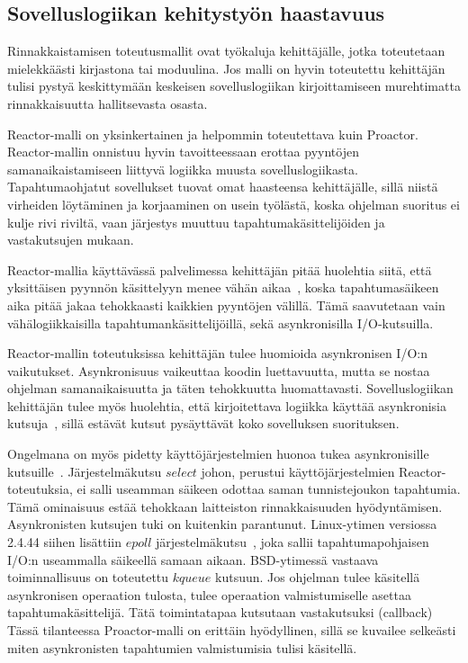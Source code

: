 \documentclass[finnish]{tktltiki2}
\theoremstyle{definition}
\theoremstyle{remark}
\begin{document}
\subsection{Sovelluslogiikan kehitystyön haastavuus}
Rinnakkaistamisen toteutusmallit ovat työkaluja kehittäjälle,
jotka toteutetaan mielekkäästi kirjastona tai moduulina.
Jos malli on hyvin toteutettu kehittäjän tulisi pystyä
keskittymään keskeisen sovelluslogiikan kirjoittamiseen
murehtimatta rinnakkaisuutta hallitsevasta osasta.

Reactor-malli on yksinkertainen ja helpommin toteutettava
kuin Proactor. Reactor-mallin onnistuu hyvin tavoitteessaan
erottaa pyyntöjen samanaikaistamiseen liittyvä logiikka
muusta sovelluslogiikasta.
Tapahtumaohjatut sovellukset tuovat omat haasteensa
kehittäjälle, sillä niistä virheiden löytäminen ja
korjaaminen on usein työlästä, koska ohjelman
suoritus ei kulje rivi riviltä, vaan järjestys
muuttuu tapahtumakäsittelijöiden ja vastakutsujen mukaan.

Reactor-mallia käyttävässä palvelimessa kehittäjän
pitää huolehtia siitä, että yksittäisen pyynnön
käsittelyyn menee vähän aikaa~\cite{pyarali_proactor_1997}, koska
tapahtumasäikeen aika pitää jakaa tehokkaasti
kaikkien pyyntöjen välillä. Tämä saavutetaan
vain vähälogiikkaisilla tapahtumankäsittelijöillä, sekä
asynkronisilla I/O-kutsuilla.

Reactor-mallin toteutuksissa kehittäjän tulee huomioida
asynkronisen I/O:n vaikutukset. Asynkronisuus vaikeuttaa koodin
luettavuutta, mutta se nostaa ohjelman samanaikaisuutta ja täten
tehokkuutta huomattavasti. Sovelluslogiikan kehittäjän
tulee myös huolehtia, että kirjoitettava logiikka
käyttää asynkronisia kutsuja~\cite{pyarali_proactor_1997}, sillä estävät
kutsut pysäyttävät koko sovelluksen suorituksen.

Ongelmana on myös pidetty käyttöjärjestelmien huonoa
tukea asynkronisille kutsuille~\cite{pyarali_proactor_1997}. Järjestelmäkutsu
$select$ johon, perustui käyttöjärjestelmien Reactor-toteutuksia,
ei salli useamman säikeen odottaa saman tunnistejoukon tapahtumia.
Tämä ominaisuus estää tehokkaan laitteiston rinnakkaisuuden hyödyntämisen.
Asynkronisten kutsujen tuki on kuitenkin parantunut.
Linux-ytimen versiossa
2.4.44 siihen lisättiin $epoll$ järjestelmäkutsu~\cite{man_epoll}, joka
sallii tapahtumapohjaisen I/O:n useammalla säikeellä
samaan aikaan. BSD-ytimessä vastaava toiminnallisuus on toteutettu $kqueue$
kutsuun.
Jos ohjelman tulee käsitellä
asynkronisen operaation tulosta, tulee operaation valmistumiselle
asettaa tapahtumakäsittelijä. Tätä toimintatapaa kutsutaan vastakutsuksi (callback)
Tässä tilanteessa Proactor-malli on erittäin hyödyllinen, sillä se
kuvailee selkeästi miten asynkronisten tapahtumien valmistumisia tulisi käsitellä.
\end{document}
